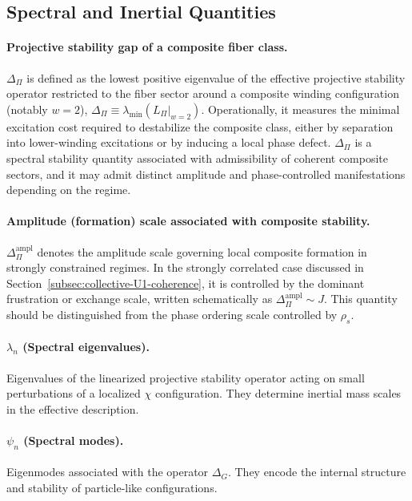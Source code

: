 \subsection{Spectral and Inertial Quantities}
  \label{subsec:spectral-and-inertial-quantities}

  \paragraph[$\Delta_{\Pi}$]{Projective stability gap of a composite fiber class.}
    $\Delta_{\Pi}$ is defined as the lowest positive eigenvalue of the effective
    projective stability operator restricted to the fiber sector around a composite
    winding configuration (notably $w=2$),
    $\Delta_{\Pi} \equiv \lambda_{\min}(L_{\Pi}|_{w=2})$.
    Operationally, it measures the minimal excitation cost required to destabilize the composite class,
    either by separation into lower-winding excitations or by inducing a local phase defect.
    $\Delta_{\Pi}$ is a spectral stability quantity associated with admissibility of coherent composite sectors,
    and it may admit distinct amplitude and phase-controlled manifestations depending on the regime.

  \paragraph[$\Delta_{\Pi}^{\mathrm{ampl}}$]{Amplitude (formation) scale associated with composite stability.}
    $\Delta_{\Pi}^{\mathrm{ampl}}$
    denotes the amplitude scale governing local composite formation in strongly constrained regimes.
    In the strongly correlated case discussed in Section~\ref{subsec:collective-U1-coherence},
    it is controlled by the dominant frustration or exchange scale, written schematically as
    $\Delta_{\Pi}^{\mathrm{ampl}} \sim J$.
    This quantity should be distinguished from the phase ordering scale controlled by $\rho_s$.

  \paragraph{\texorpdfstring{$\lambda_n$}{λn} (Spectral eigenvalues).}
    Eigenvalues of the linearized projective stability operator acting on small
    perturbations of a localized $\chi$ configuration.
    They determine inertial mass scales in the effective description.

  \paragraph{\texorpdfstring{$\psi_n$}{ψn} (Spectral modes).}
    Eigenmodes associated with the operator $\Delta_G$.
    They encode the internal structure and stability of particle-like configurations.

